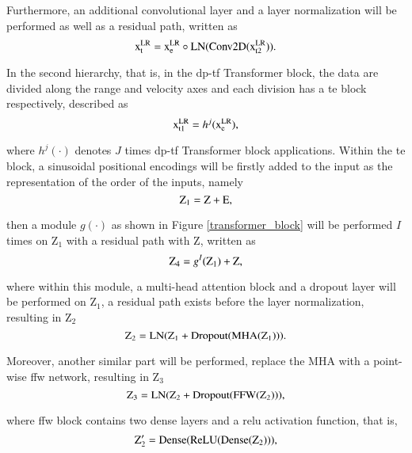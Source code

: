 Furthermore, an additional convolutional layer and a layer normalization will be performed as well as a residual path, written as
\begin{equation}
    \centering
    \mathrm{x^{LR}_{t} = x^{LR}_{e} \circ LN(Conv2D(x^{LR}_{t2}))}.
    \label{second equation in feature transformer}
\end{equation}

In the second hierarchy, that is, in the \gls{dp}-\gls{tf} Transformer block, the data are divided along the range and velocity axes and each division has a \gls{te} block respectively, described as
\begin{equation}
    \centering
    \mathrm{x^{LR}_{t1}} = h^{j}\mathrm{(x^{LR}_{e})},
\end{equation}

where $h^{j}(\cdot)$ denotes $J$ times \gls{dp}-\gls{tf} Transformer block applications. Within the \gls{te} block, a sinusoidal positional encodings will be firstly added to the input as the representation of the order of the inputs, namely
\begin{equation}
    \centering
    \mathrm{Z_1 = Z + E},
\end{equation}

then a module $g(\cdot)$ as shown in Figure \ref{transformer_block} will be performed $I$ times on $\mathrm{Z_1}$ with a residual path with Z, written as
\begin{equation}
    \centering
    \mathrm{Z_4} = g^{I}\mathrm{(Z_1) + Z},
\end{equation}

where within this module, a multi-head attention block and a dropout layer will be performed on $\mathrm{Z_1}$, a residual path exists before the layer normalization, resulting in $\mathrm{Z_2}$
\begin{equation}
    \centering
    \mathrm{Z_2 = LN(Z_1 + Dropout(MHA(Z_1)))}.
\end{equation}

Moreover, another similar part will be performed, replace the MHA with a point-wise \gls{ffw} network, resulting in $\mathrm{Z_3}$
\begin{equation}
    \centering
    \mathrm{Z_3 = LN(Z_2 + Dropout(FFW(Z_2)))},
\end{equation}

where \gls{ffw} block contains two dense layers and a \gls{relu} activation function, that is,
\begin{equation}
    \centering
    \mathrm{Z'_2 = Dense(ReLU(Dense(Z_2)))},
    \label{ffw equation}
\end{equation}

